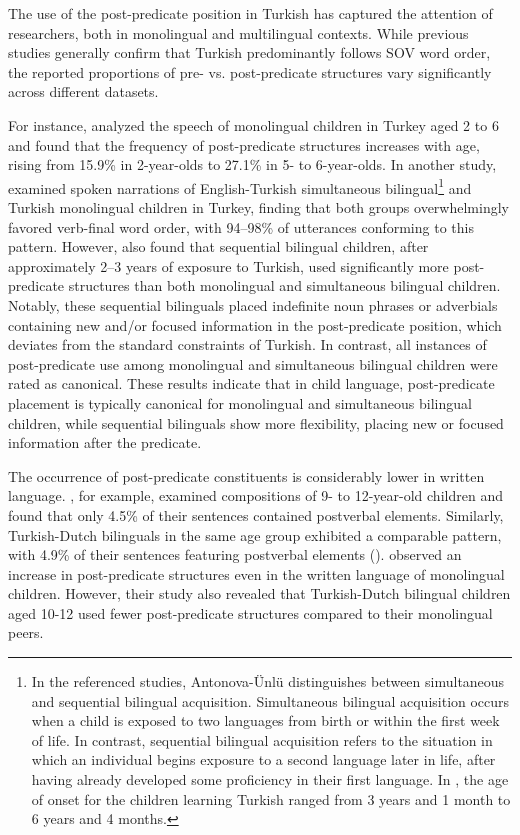 The use of the post-predicate position in Turkish has captured the attention of researchers, both in monolingual and multilingual contexts. While previous studies generally confirm that Turkish predominantly follows SOV word order, the reported proportions of pre- vs. post-predicate structures vary significantly across different datasets.

\largerpage
For instance, \citet{Saginsimsek2016} analyzed the speech of monolingual children in Turkey aged 2 to 6 and found that the frequency of post-predicate structures increases with age, rising from 15.9\% in 2-year-olds to 27.1\% in 5- to 6-year-olds. In another study, \citet{Antonova-unlu2015} examined spoken narrations of English-Turkish simultaneous bilingual\footnote{In the referenced studies, Antonova-Ünlü distinguishes between simultaneous and sequential bilingual acquisition. Simultaneous bilingual acquisition occurs when a child is exposed to two languages from birth or within the first week of life. In contrast, sequential bilingual acquisition refers to the situation in which an individual begins exposure to a second language later in life, after having already developed some proficiency in their first language. In \citet{Antonova-unlu2019}, the age of onset for the children learning Turkish ranged from 3 years and 1 month to 6 years and 4 months.} and Turkish monolingual children in Turkey, finding that both groups overwhelmingly favored verb-final word order, with 94--98\% of utterances conforming to this pattern. However, \citet{Antonova-unlu2019} also found that sequential bilingual children, after approximately 2--3 years of exposure to Turkish, used significantly more post-predicate structures than both monolingual and simultaneous bilingual children. Notably, these sequential bilinguals placed indefinite noun phrases or adverbials containing new and/or focused information in the post-predicate position, which deviates from the standard constraints of Turkish. In contrast, all instances of post-predicate use among monolingual and simultaneous bilingual children were rated as canonical. These results indicate that in child language, post-predicate placement is typically canonical for monolingual and simultaneous bilingual children, while sequential bilinguals show more flexibility, placing new or focused information after the predicate.

The occurrence of post-predicate constituents is considerably lower in written language. \citet{Kocak2005}, for example, examined compositions of 9- to 12-year-old children and found that only 4.5\% of their sentences contained postverbal elements. Similarly, Turkish-Dutch bilinguals in the same age group exhibited a comparable pattern, with 4.9\% of their sentences featuring postverbal elements (\citealt{Halitoglu2020}). \citet{TerziyanBackus2023} observed an increase in post-predicate structures even in the written language of monolingual children. However, their study also revealed that Turkish-Dutch bilingual children aged 10-12 used fewer post-predicate structures compared to their monolingual peers.

